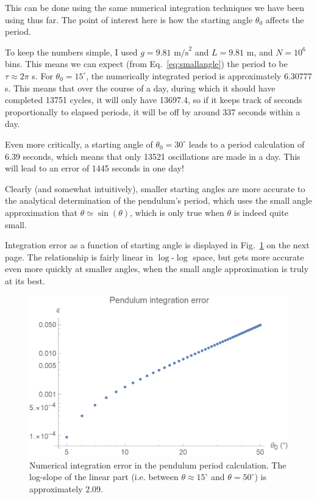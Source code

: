 \documentclass{article}
\begin{document}
This can be done using the same numerical integration techniques we have been using thus far. The point of interest here is how the starting angle $\theta_0$ affects the period.

To keep the numbers simple, I used $g=9.81\text{ m/s}^2$ and $L=9.81$ m, and $N=10^6$ bins. This means we can expect (from Eq.~\ref{eq:smallangle}) the period to be $\tau\approx2\pi$ s. For $\theta_0=15^\circ$, the numerically integrated period is approximately 6.30777 s. This means that over the course of a day, during which it should have completed 13751 cycles, it will only have 13697.4, so if it keeps track of seconds proportionally to elapsed periods, it will be off by around 337 seconds within a day.

Even more critically, a starting angle of $\theta_0=30^\circ$ leads to a period calculation of 6.39 seconds, which means that only 13521 oscillations are made in a day. This will lead to an error of 1445 seconds in one day!

Clearly (and somewhat intuitively), smaller starting angles are more accurate to the analytical determination of the pendulum's period, which uses the small angle approximation that $\theta \simeq \sin(\theta)$, which is only true when $\theta$ is indeed quite small.

\bigskip
{}
\medskip

Integration error as a function of starting angle is displayed in Fig.~\ref{fig:pendulum} on the next page. The relationship is fairly linear in $\log$-$\log$ space, but gets more accurate even more quickly at smaller angles, when the small angle approximation is truly at its best.

\begin{figure}[!h]
    \centering
    \includegraphics[width=4.75in]{homework2/pendulum.png}
    \caption{Numerical integration error in the pendulum period calculation. The log-slope of the linear part (i.e. between $\theta\approx15^\circ$ and $\theta=50^\circ$) is approximately 2.09.}
    \label{fig:pendulum}
\end{figure}
\end{document}
